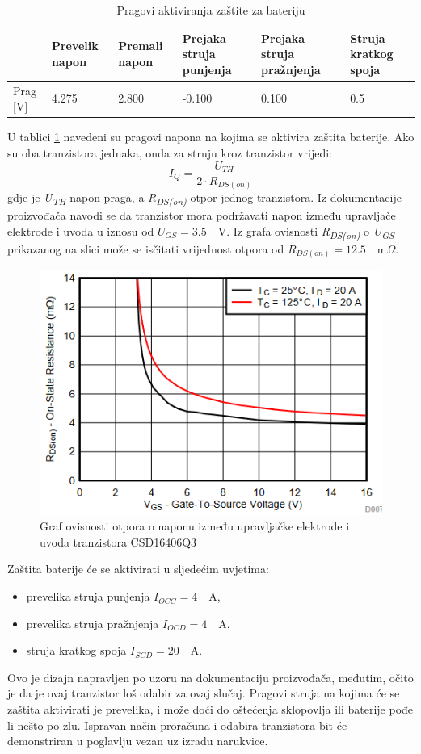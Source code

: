 \begin{table}[htbp]
    \centering
    \caption{Pragovi aktiviranja zaštite za bateriju \cite{ti:bq29700}}
    \begin{tabular}{|l|p{1.5cm}|p{1.5cm}|p{2.5cm}|p{2.5cm}|p{2.5cm}|} \hline
    \raggedright
    & Prevelik napon & Premali napon & Prejaka struja punjenja & Prejaka struja pražnjenja & Struja kratkog spoja \\
    \hline
    Prag [V] & 4.275 & 2.800 & -0.100 & 0.100 & 0.5 \\
    \hline
    \end{tabular}%
    \label{tab:BQ29700}%
\end{table}%
U tablici \ref{tab:BQ29700} navedeni su pragovi napona na kojima se aktivira zaštita baterije. Ako su oba tranzistora jednaka, onda za struju kroz tranzistor vrijedi:
\begin{equation} \label{eq:TRANCUR}
    I_Q = \frac{U_{TH}}{2\cdot R_{DS(on)}}
\end{equation}
gdje je \textit{U\textsubscript{TH}} napon praga, a \textit{R\textsubscript{DS(on)}} otpor jednog tranzistora. Iz dokumentacije proizvođača navodi se da tranzistor mora podržavati napon između upravljače elektrode i uvoda u iznosu od $U_{GS}=3.5 \quad \textrm{V}$. Iz grafa ovisnosti \textit{R\textsubscript{DS(on)}} o \textit{U\textsubscript{GS}} prikazanog na slici može se isčitati vrijednost otpora od $R_{DS(on)}=12.5\quad \textrm{m}\Omega$.
\begin{figure}[hbt]
    \centering
    \includegraphics[width=10 cm]{Figures/RDS_OLD.PNG}
    \caption{Graf ovisnosti otpora o naponu između upravljačke elektrode i uvoda tranzistora CSD16406Q3 \cite{ti:csd1640}}
    \label{slk:RDS_OLD}
\end{figure}
Zaštita baterije će se aktivirati u sljedećim uvjetima:
\begin{itemize}
    \item prevelika struja punjenja $I_{OCC}=4\quad \textrm{A}$,
    \item prevelika struja pražnjenja $I_{OCD}=4\quad \textrm{A}$,
    \item struja kratkog spoja $I_{SCD}=20\quad \textrm{A}$.
\end{itemize}
Ovo je dizajn napravljen po uzoru na dokumentaciju proizvođača, međutim, očito je da je ovaj tranzistor loš odabir za ovaj slučaj. Pragovi struja na kojima će se zaštita aktivirati je prevelika, i može doći do oštećenja sklopovlja ili baterije pođe li nešto po zlu. Ispravan način proračuna i odabira tranzistora bit će demonstriran u poglavlju vezan uz izradu narukvice.


